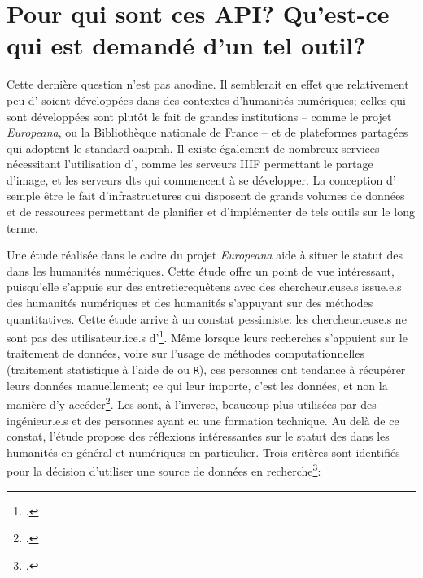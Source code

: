\section{Pour qui sont ces API? Qu'est-ce qui est demandé d'un tel outil?}
Cette dernière question n'est pas anodine. Il semblerait en effet que relativement peu d'\api{} soient développées dans des contextes d'humanités numériques; celles qui sont développées sont plutôt le fait de grandes institutions -- comme le projet \textit{Europeana}, ou la Bibliothèque nationale de France -- et de plateformes partagées qui adoptent le standard \gls{oaipmh}. Il existe également de nombreux services nécessitant l'utilisation d'\api{}, comme les serveurs IIIF permettant le partage d'image, et les serveurs \gls{dts} qui commencent à se développer. La conception d'\api{} semple être le fait d'infrastructures qui disposent de grands volumes de données et de ressources permettant de planifier et d'implémenter de tels outils sur le long terme. 

Une étude réalisée dans le cadre du projet \textit{Europeana} aide à situer le statut des \api{} dans les humanités numériques. Cette étude offre un point de vue intéressant, puisqu'elle s'appuie sur des entretierequêtens avec des chercheur.euse.s issue.e.s des humanités numériques et des humanités s'appuyant sur des méthodes quantitatives. Cette étude arrive à un constat pessimiste: les chercheur.euse.s ne sont pas des utilisateur.ice.s d'\api{}\footcite[p. 288]{edmond_apis_2015}. Même lorsque leurs recherches s'appuient sur le traitement de données, voire sur l'usage de méthodes computationnelles (traitement statistique à l'aide de \py{} ou \texttt{R}), ces personnes ont tendance à récupérer leurs données manuellement; ce qui leur importe, c'est les données, et non la manière d'y accéder\footcite[p. 290]{edmond_apis_2015}. Les \api{} sont, à l'inverse, beaucoup plus utilisées par des ingénieur.e.s et des personnes ayant eu une formation technique. Au delà de ce constat, l'étude propose des réflexions intéressantes sur le statut des \api{} dans les humanités en général et numériques en particulier. Trois critères sont identifiés pour la décision d'utiliser une source de données en recherche\footcite[p. 292-294]{edmond_apis_2015}:

